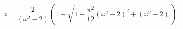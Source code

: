 \begin{equation}
z=\frac{2}{\left( \omega ^{2}-2\right) }\left( 1+\sqrt{1-\frac{\pi
^{2}}{12} \left( \omega ^{2}-2\right) ^{2}+\left( \omega
^{2}-2\right) }\,\right) . \label{z}
\end{equation}

